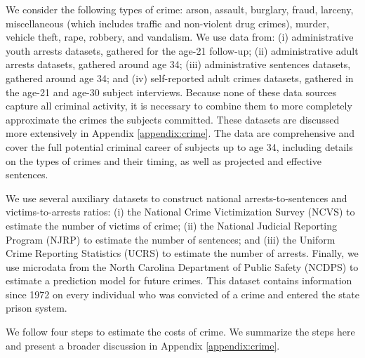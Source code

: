 We consider the following types of crime: arson, assault, burglary, fraud, larceny, miscellaneous (which includes traffic and non-violent drug crimes), murder, vehicle theft, rape, robbery, and vandalism. We use data from: (i) administrative youth arrests datasets, gathered for the age-21 follow-up; (ii) administrative adult arrests datasets, gathered around age 34; (iii) administrative sentences datasets, gathered around age 34; and (iv) self-reported adult crimes datasets, gathered in the age-21 and age-30 subject interviews. Because none of these data sources capture all criminal activity, it is necessary to combine them to more completely approximate the crimes the subjects committed. These datasets are discussed more extensively in Appendix \ref{appendix:crime}. The data are comprehensive and cover the full potential criminal career of subjects up to age 34, including details on the types of crimes and their timing, as well as projected and effective sentences.

We use several auxiliary datasets to construct national arrests-to-sentences and victims-to-arrests ratios: (i) the National Crime Victimization Survey (NCVS) to estimate the number of victims of crime; (ii) the National Judicial Reporting Program (NJRP) to estimate the number of sentences; and (iii) the Uniform Crime Reporting Statistics (UCRS) to estimate the number of arrests. Finally, we use microdata from the North Carolina Department of Public Safety (NCDPS) to estimate a prediction model for future crimes. This dataset contains information since 1972 on every individual who was convicted of a crime and entered the state prison system.

We follow four steps to estimate the costs of crime. We summarize the steps here and present a broader discussion in Appendix \ref{appendix:crime}.

